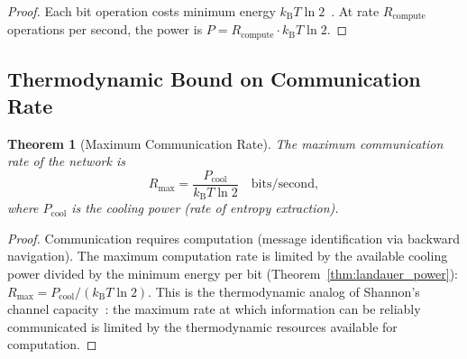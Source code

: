 \documentclass[11pt,twocolumn,a4paper]{article}
\newtheorem{theorem}{Theorem}[section]
\theoremstyle{definition}
\newcommand{\kB}{k_{\mathrm{B}}}
\begin{document}
\begin{proof}
Each bit operation costs minimum energy $\kB T \ln 2$~\cite{landauer1961}. At rate
$R_{\mathrm{compute}}$ operations per second, the power is
$P = R_{\mathrm{compute}} \cdot \kB T \ln 2$.
\end{proof}

\subsection{Thermodynamic Bound on Communication Rate}\label{sec:ep:comm_rate}

\begin{theorem}[Maximum Communication Rate]\label{thm:max_comm}
The maximum communication rate of the network is
\begin{equation}\label{eq:max_comm}
  R_{\max} = \frac{P_{\mathrm{cool}}}{\kB T \ln 2} \quad \text{bits/second},
\end{equation}
where $P_{\mathrm{cool}}$ is the cooling power (rate of entropy extraction).
\end{theorem}

\begin{proof}
Communication requires computation (message identification via backward navigation).
The maximum computation rate is limited by the available cooling power divided by the
minimum energy per bit (Theorem~\ref{thm:landauer_power}):
$R_{\max} = P_{\mathrm{cool}} / (\kB T \ln 2)$.
This is the thermodynamic analog of Shannon's channel capacity~\cite{shannon1948}: the
maximum rate at which information can be reliably communicated is limited by the
thermodynamic resources available for computation.
\end{proof}
\end{document}
